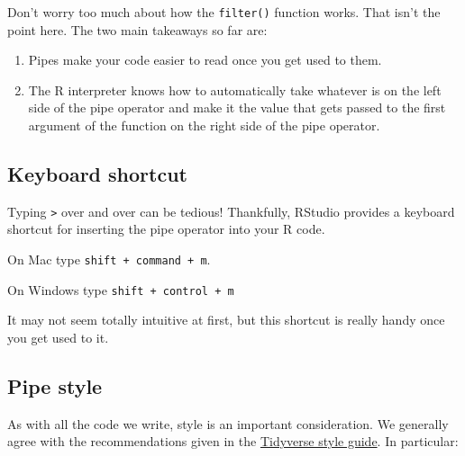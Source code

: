 \documentclass[
  letterpaper,
  DIV=11,
  numbers=noendperiod]{scrreprt}
\begin{document}
Don't worry too much about how the \texttt{filter()} function works.
That isn't the point here. The two main takeaways so far are:

\begin{enumerate}
\def\labelenumi{\arabic{enumi}.}
\item
  Pipes make your code easier to read once you get used to them.
\item
  The R interpreter knows how to automatically take whatever is on the
  left side of the pipe operator and make it the value that gets passed
  to the first argument of the function on the right side of the pipe
  operator.
\end{enumerate}

\subsection{Keyboard shortcut}\label{keyboard-shortcut}

Typing \texttt{\textbar{}\textgreater{}} over and over can be tedious!
Thankfully, RStudio provides a keyboard shortcut for inserting the pipe
operator into your R code.

On Mac type \texttt{shift\ +\ command\ +\ m}.

On Windows type \texttt{shift\ +\ control\ +\ m}

It may not seem totally intuitive at first, but this shortcut is really
handy once you get used to it.

\subsection{Pipe style}\label{pipe-style}

As with all the code we write, style is an important consideration. We
generally agree with the recommendations given in the
\href{https://style.tidyverse.org/pipes.html}{Tidyverse style guide}. In
particular:
\end{document}
